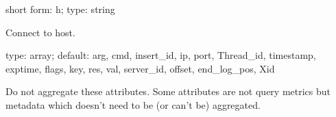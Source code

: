 \documentclass[letterpaper,10pt,english]{sphinxmanual}
\begin{document}
\begin{fulllineitems}
\label{\detokenize{mariadb-query-digest:cmdoption-mariadb-query-digest-host}}
short form: \sphinxhyphen{}h; type: string

Connect to host.

\end{fulllineitems}


\begin{fulllineitems}
\label{\detokenize{mariadb-query-digest:cmdoption-mariadb-query-digest-ignore-attributes}}
type: array; default: arg, cmd, insert\_id, ip, port, Thread\_id, timestamp, exptime, flags, key, res, val, server\_id, offset, end\_log\_pos, Xid

Do not aggregate these attributes.  Some attributes are not query metrics
but metadata which doesn’t need to be (or can’t be) aggregated.

\end{fulllineitems}

\end{document}
